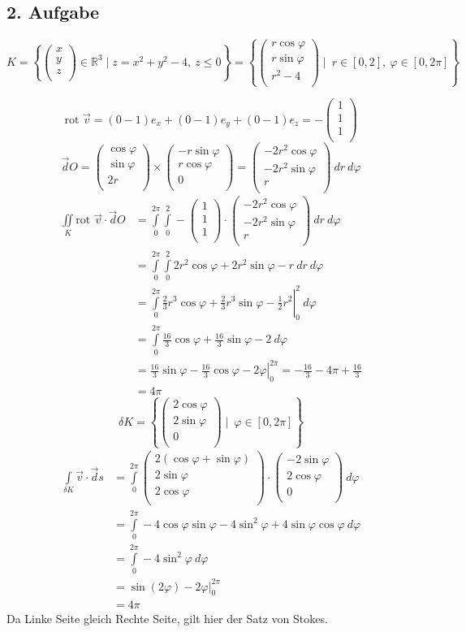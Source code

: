 \documentclass[10pt,a4paper,parskip=half]{scrartcl}
\newcommand{\R}{\mathbb{R}}
\newcommand{\vecthree}[3]{\begin{pmatrix}#1\\#2\\#3\\\end {pmatrix}}
\begin{document}
\subsection*{2. Aufgabe}
\[ K = \left\{  \vecthree{x}{y}{z} \in \R^3 \mid z = x^2 + y^2 - 4,~z \le 0  \right\}  = \left\{  \vecthree{r \cos \varphi}{r \sin \varphi}{r^2 - 4} \mid~ r \in [0,2] ,~ \varphi \in [0,2\pi] \right\} \]

\[ \text{rot } \vec v =  (0 - 1 )e_x + (0 - 1 )e_y + (0 - 1)e_z = -\vecthree{1}{1}{1}\]
\[ \vec dO = \vecthree{\cos \varphi}{\sin \varphi}{2r} \times \vecthree{-r\sin \varphi}{r\cos \varphi}{0} = \vecthree{-2r^2 \cos \varphi}{-2r^2\sin \varphi}{r} ~dr~ d\varphi \]
\begin{align*}
\iint\limits_{K} \text{rot } \vec v \cdot \vec dO &= \int\limits_{0}^{2\pi}\int\limits_{0}^{2} -\vecthree{1}{1}{1} \cdot \vecthree{-2r^2 \cos \varphi}{-2r^2\sin \varphi}{r} ~dr~ d\varphi \\
&= \int\limits_{0}^{2\pi}\int\limits_{0}^{2} 2r^2\cos \varphi + 2r^2 \sin \varphi -r   ~dr~ d\varphi \\
&= \left.\int\limits_{0}^{2\pi} \frac 23 r^3 \cos \varphi + \frac 23 r^3 \sin \varphi - \frac 12 r^2 \right|_{0}^{2}   ~ d\varphi \\
&= \int\limits_{0}^{2\pi} \frac {16}3  \cos \varphi + \frac {16}{3} \sin \varphi - 2   ~ d\varphi \\
&= \left.\frac {16}3  \sin \varphi - \frac {16}{3} \cos \varphi - 2\varphi \right|_{0}^{2\pi}   
= - \frac {16}{3} - 4\pi + \frac{16}{3} \\
&= 4\pi
\end{align*}
\[ \delta K =  \left\{  \vecthree{2 \cos \varphi}{2 \sin \varphi}{0} \mid~ \varphi \in [0,2\pi] \right\} \]
\begin{align*}
\int\limits_{\delta K} \vec v \cdot \vec ds &= \int\limits_{0}^{2\pi}\vecthree{2(\cos \varphi+ \sin \varphi)}{2\sin\varphi}{2\cos\varphi} \cdot \vecthree{-2\sin \varphi}{2\cos \varphi}{0} ~d\varphi \\
&= \int\limits_{0}^{2\pi} -4 \cos\varphi\sin \varphi -4 \sin^2 \varphi + 4\sin \varphi\cos\varphi ~d\varphi \\
&= \int\limits_{0}^{2\pi} -4 \sin^2 \varphi ~d\varphi \\
&= \left. \sin(2\varphi) - 2\varphi \right|^{2\pi}_0 \\
&= 4\pi
\end{align*}
Da Linke Seite gleich Rechte Seite, gilt hier der Satz von Stokes.
\end{document}

